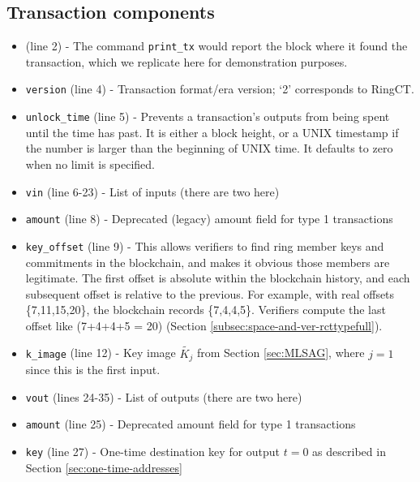 \begin{appendices}
\section*{Transaction components}
	
\begin{itemize}
    \item (line 2) - The command {\tt print\_tx} would report the block where it found the transaction, which we replicate here for demonstration purposes.
	\item {\tt version} (line 4) - Transaction format/era version; `2' corresponds to RingCT.
	\item {\tt unlock\_time} (line 5) - Prevents a transaction's outputs from being spent until the time has past. It is either a block height, or a UNIX timestamp if the number is larger than the beginning of UNIX time. It defaults to zero when no limit is specified.	
	\item {\tt vin} (line 6-23) - List of inputs (there are two here)
	\item {\tt amount} (line 8) - Deprecated (legacy) amount field for type 1 transactions
	\item {\tt key\_offset} (line 9) - This allows verifiers to find ring member keys and commitments in the blockchain, and makes it obvious those members are legitimate. The first offset is absolute within the blockchain history, and each subsequent offset is relative to the previous. For example, with real offsets \{7,11,15,20\}, the blockchain records \{7,4,4,5\}. Verifiers compute the last offset like (7+4+4+5 = 20) (Section \ref{subsec:space-and-ver-rcttypefull}).
	\item {\tt k\_image} (line 12) - Key image \(\tilde{K_j}\) from Section \ref{sec:MLSAG}, where $j = 1$ since this is the first input.
	\item {\tt vout} (lines 24-35) - List of outputs (there are two here)
	\item {\tt amount} (line 25) - Deprecated amount field for type 1 transactions
	\item {\tt key} (line 27) - One-time destination key for output $t = 0$ as described in Section \ref{sec:one-time-addresses}

\end{itemize}
\end{appendices}
